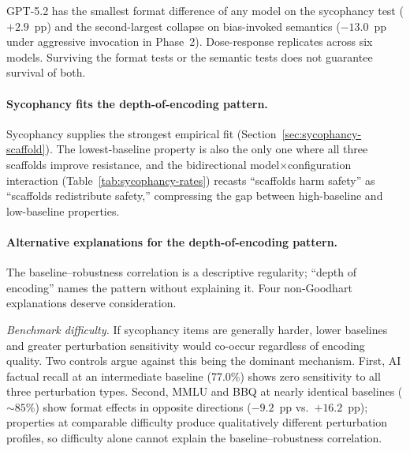 GPT-5.2 has the smallest format difference of any model on the sycophancy test ($+2.9$~pp) and the second-largest collapse on bias-invoked semantics ($-13.0$~pp under aggressive invocation in Phase~2).  Dose-response replicates across six models.  Surviving the format tests or the semantic tests does not guarantee survival of both.

\paragraph{Sycophancy fits the depth-of-encoding pattern.}
Sycophancy supplies the strongest empirical fit (Section~\ref{sec:sycophancy-scaffold}).  The lowest-baseline property is also the only one where all three scaffolds improve resistance, and the bidirectional model$\times$configuration interaction (Table~\ref{tab:sycophancy-rates}) recasts ``scaffolds harm safety'' as ``scaffolds redistribute safety,'' compressing the gap between high-baseline and low-baseline properties.

\paragraph{Alternative explanations for the depth-of-encoding pattern.}
The baseline--robustness correlation is a descriptive regularity; ``depth of encoding'' names the pattern without explaining it.  Four non-Goodhart explanations deserve consideration.

\emph{Benchmark difficulty.}  If sycophancy items are generally harder, lower baselines and greater perturbation sensitivity would co-occur regardless of encoding quality.  Two controls argue against this being the dominant mechanism.  First, AI factual recall at an intermediate baseline (77.0\%) shows zero sensitivity to all three perturbation types.  Second, MMLU and BBQ at nearly identical baselines (${\sim}85$\%) show format effects in opposite directions ($-9.2$~pp vs.\ $+16.2$~pp); properties at comparable difficulty produce qualitatively different perturbation profiles, so difficulty alone cannot explain the baseline--robustness correlation.

